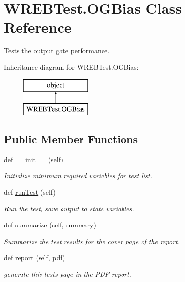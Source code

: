 \hypertarget{class_w_r_e_b_test_1_1_o_g_bias}{}\section{W\+R\+E\+B\+Test.\+O\+G\+Bias Class Reference}
\label{class_w_r_e_b_test_1_1_o_g_bias}


Tests the output gate performance.  


Inheritance diagram for W\+R\+E\+B\+Test.\+O\+G\+Bias\+:\begin{figure}[H]
\begin{center}
\leavevmode
\includegraphics[height=2.000000cm]{class_w_r_e_b_test_1_1_o_g_bias}
\end{center}
\end{figure}
\subsection*{Public Member Functions}
\begin{DoxyCompactItemize}
\item 
def \hyperlink{class_w_r_e_b_test_1_1_o_g_bias_a54e5379325a6a8707049e5287b4a540b}{\+\_\+\+\_\+init\+\_\+\+\_\+} (self)
\begin{DoxyCompactList}\small\item\em Initialize minimum required variables for test list. \end{DoxyCompactList}\item 
def \hyperlink{class_w_r_e_b_test_1_1_o_g_bias_ab3882e57d4909ecab2f9a255661df21d}{run\+Test} (self)
\begin{DoxyCompactList}\small\item\em Run the test, save output to state variables. \end{DoxyCompactList}\item 
def \hyperlink{class_w_r_e_b_test_1_1_o_g_bias_a9efac6be807016d3ed4359aae56e15a8}{summarize} (self, summary)
\begin{DoxyCompactList}\small\item\em Summarize the test results for the cover page of the report. \end{DoxyCompactList}\item 
def \hyperlink{class_w_r_e_b_test_1_1_o_g_bias_adf3bd193e9ce960daf2ac3444a4a79cf}{report} (self, pdf)
\begin{DoxyCompactList}\small\item\em generate this test\textquotesingle{}s page in the P\+DF report. \end{DoxyCompactList}\end{DoxyCompactItemize}


